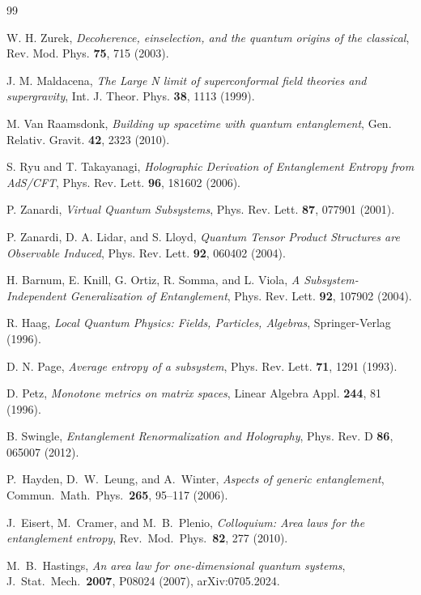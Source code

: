\documentclass[12pt,a4paper]{article}
\begin{document}
\begin{thebibliography}{99}

W. H. Zurek, \emph{Decoherence, einselection, and the quantum origins of the classical}, Rev. Mod. Phys. \textbf{75}, 715 (2003).

J. M. Maldacena, \emph{The Large N limit of superconformal field theories and supergravity}, Int. J. Theor. Phys. \textbf{38}, 1113 (1999).

M. Van Raamsdonk, \emph{Building up spacetime with quantum entanglement}, Gen. Relativ. Gravit. \textbf{42}, 2323 (2010).

S. Ryu and T. Takayanagi, \emph{Holographic Derivation of Entanglement Entropy from AdS/CFT}, Phys. Rev. Lett. \textbf{96}, 181602 (2006).

P. Zanardi, \emph{Virtual Quantum Subsystems}, Phys. Rev. Lett. \textbf{87}, 077901 (2001).

P. Zanardi, D. A. Lidar, and S. Lloyd, \emph{Quantum Tensor Product Structures are Observable Induced}, Phys. Rev. Lett. \textbf{92}, 060402 (2004).

H. Barnum, E. Knill, G. Ortiz, R. Somma, and L. Viola, \emph{A Subsystem-Independent Generalization of Entanglement}, Phys. Rev. Lett. \textbf{92}, 107902 (2004).

R. Haag, \emph{Local Quantum Physics: Fields, Particles, Algebras}, Springer-Verlag (1996).

D. N. Page, \emph{Average entropy of a subsystem}, Phys. Rev. Lett. \textbf{71}, 1291 (1993).

D. Petz, \emph{Monotone metrics on matrix spaces}, Linear Algebra Appl. \textbf{244}, 81 (1996).

B. Swingle, \emph{Entanglement Renormalization and Holography}, Phys. Rev. D \textbf{86}, 065007 (2012).

P.~Hayden, D.~W.~Leung, and A.~Winter,
\emph{Aspects of generic entanglement},
Commun.\ Math.\ Phys.\ \textbf{265}, 95--117 (2006).

J.~Eisert, M.~Cramer, and M.~B.~Plenio,
\emph{Colloquium: Area laws for the entanglement entropy},
Rev.\ Mod.\ Phys.\ \textbf{82}, 277 (2010).

M.~B.~Hastings,
\emph{An area law for one-dimensional quantum systems},
J.\ Stat.\ Mech.\ \textbf{2007}, P08024 (2007),
arXiv:0705.2024.


\end{thebibliography}
\end{document}
